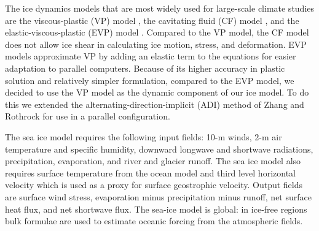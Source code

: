 The ice dynamics models that are most widely used for large-scale
climate studies are the viscous-plastic (VP) model \cite{hib79}, the
cavitating fluid (CF) model \cite{fla92}, and the
elastic-viscous-plastic (EVP) model \cite{hun97}.  Compared to the VP
model, the CF model does not allow ice shear in calculating ice
motion, stress, and deformation.  EVP models approximate VP by adding
an elastic term to the equations for easier adaptation to parallel
computers.  Because of its higher accuracy in plastic solution and
relatively simpler formulation, compared to the EVP model, we decided
to use the VP model as the dynamic component of our ice model.  To do
this we extended the alternating-direction-implicit (ADI) method of
Zhang and Rothrock \cite{zha00} for use in a parallel configuration.

The sea ice model requires the following input fields: 10-m winds, 2-m
air temperature and specific humidity, downward longwave and shortwave
radiations, precipitation, evaporation, and river and glacier runoff.
The sea ice model also requires surface temperature from the ocean
model and third level horizontal velocity which is used as a proxy for
surface geostrophic velocity.  Output fields are surface wind stress,
evaporation minus precipitation minus runoff, net surface heat flux,
and net shortwave flux.  The sea-ice model is global: in ice-free
regions bulk formulae are used to estimate oceanic forcing from the
atmospheric fields.



